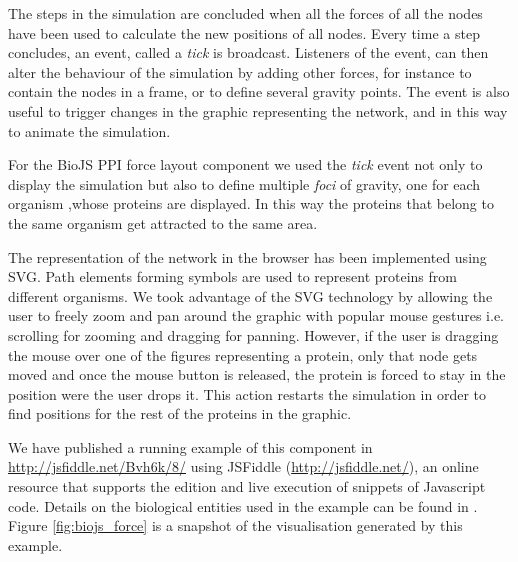 The steps in the simulation are concluded when all the forces of all the nodes have been used to calculate the new positions of all nodes. Every time a step concludes, an event, called a \emph{tick} is broadcast. Listeners of the event, can then alter the behaviour of the simulation by adding other forces, for instance to contain the nodes in a frame, or to define several gravity points. The event is also useful to trigger changes in the graphic representing the network, and in this way to animate the simulation.

For the BioJS PPI force layout component we used the \emph{tick} event not only to display the simulation but also to  define multiple \emph{foci} of gravity, one for each organism ,whose proteins are displayed. In this way the proteins that belong to the same organism get attracted to the same area.

The representation of the network in the browser has been implemented using SVG. Path elements forming symbols are used to represent proteins from different organisms. We took advantage of the SVG technology by allowing the user to freely zoom and pan around the graphic with popular mouse gestures i.e. scrolling for zooming and dragging for panning. However, if the user is dragging the mouse over one of the figures representing a protein, only that node gets moved and once the mouse button is released, the protein is forced to stay in the position were the user drops it. This action restarts the simulation in  order to find positions for the rest of the proteins in the graphic.

We have published a running example of this component  in \url{http://jsfiddle.net/Bvh6k/8/} using JSFiddle (\url{http://jsfiddle.net/}), an online resource that supports the edition and live execution of snippets of Javascript code. Details on the biological entities used in the example can be found in \cite{SAL2014}. Figure \ref{fig:biojs_force} is a snapshot of the visualisation generated by this example. 

